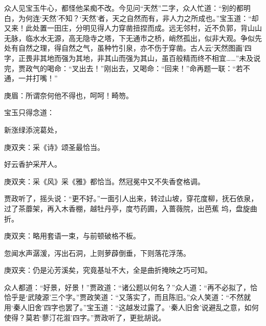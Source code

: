 \begin{parag}
    众人见宝玉牛心，都怪他呆痴不改。今见问“天然”二字，众人忙道：“别的都明白，为何连‘天然’不知？‘天然’者，天之自然而有，非人力之所成也。”宝玉道：“却又来！此处置一田庄，分明见得人力穿凿扭捏而成。远无邻村，近不负郭，背山山无脉，临水水无源，高无隐寺之塔，下无通市之桥，峭然孤出，似非大观。争似先处有自然之理，得自然之气，虽种竹引泉，亦不伤于穿凿。古人云‘天然图画’四字，正畏非其地而强为其地，非其山而强为其山，虽百般精而终不相宜……”未及说完，贾政气的喝命：“叉出去！”刚出去，又喝命：“回来！”命再题一联：“若不通，一并打嘴！”\begin{note}庚眉：所谓奈何他不得也，呵呵！畸笏。\end{note}宝玉只得念道：
\end{parag}


\begin{poem}
    \begin{pl} 新涨绿添浣葛处，\end{pl}
    \begin{note}庚双夹：采《诗》颂圣最恰当。\end{note}

    \begin{pl} 好云香护采芹人。\end{pl}
    \begin{note}庚双夹：采《风》采《雅》都恰当。然冠冕中又不失香奁格调。\end{note}
\end{poem}


\begin{parag}
    贾政听了，摇头说：“更不好。”一面引人出来，转过山坡，穿花度柳，抚石依泉，过了茶蘼架，再入木香棚，越牡丹亭，度芍药圃，入蔷薇院，出芭蕉 坞，盘旋曲折。\begin{note}庚双夹：略用套语一束，与前顿破格不板。\end{note}忽闻水声潺湲，泻出石洞，上则萝薜倒垂，下则落花浮荡。\begin{note}庚双夹：仍是沁芳溪矣，究竟基址不大，全是曲折掩映之巧可知。\end{note}众人都道：“好景，好景！”贾政道：“诸公题以何名？”众人道：“再不必拟了，恰恰乎是‘武陵源’三个字。”贾政笑道：“又落实了，而且陈旧。”众人笑道：“不然就用‘秦人旧舍’四字也罢了。”宝玉道：“这越发过露了。‘秦人旧舍’说避乱之意，如何使得？莫若‘蓼汀花溆’四字。”贾政听了，更批胡说。
\end{parag}


